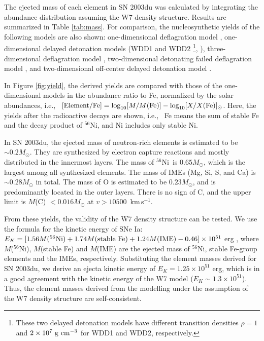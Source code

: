 \documentclass[usegraphicx,usenatbib]{mn2e}
\newcommand{\kms}{\mbox{\,km\,s$^{-1}$}}
\newcommand{\ie}{i.e.,\ }
\newcommand{\Msun}{M_{\odot}}
\newcommand{\Nifs}{$^{56}$Ni}
\begin{document}
The ejected mass of each element in SN 2003du was calculated by integrating the
abundance distribution assuming the W7 density structure. Results are summarized
in Table \ref{tab:mass}. For comparison, the nucleosynthetic yields of the
following models are also shown: one-dimensional deflagration model
\citep[W7,][]{nomoto84}, one-dimensional delayed detonation models (WDD1 and
WDD2 \footnote{These two delayed detonation models have different transition 
densities $\rho = 1$ and $2 \times 10^7 \ {\rm g\ cm^{-3}}$ for WDD1 and  WDD2,
respectively.}, \citealt{iwamoto99}), three-dimensional deflagration model
\citep[b30\_3d\_768,][]{travaglio04}, two-dimensional detonating failed
deflagration model \citep[Y12,][]{plewa07}, and two-dimensional  off-center
delayed detonation model \citep[O-DDT,][]{maeda10nuc}.

In Figure \ref{fig:yield}, the derived yields are compared with 
those of the one-dimensional models 
in the abundance ratio to Fe, normalized by the solar abundances, \ie
$[{\rm Element / Fe}] = {\rm log}_{10}[M/M({\rm Fe})] - {\rm log}_{10}[X/X({\rm Fe})]_{\odot}$.
Here, the yields after the radioactive decays are shown, \ie
Fe means the sum of stable Fe and the decay product of \Nifs,
and Ni includes only stable Ni.

In SN 2003du, the ejected mass of neutron-rich elements is estimated to be 
$\sim 0.2 \Msun$. They are synthesized by electron capture reactions and 
mostly distributed in the innermost layers. The mass of \Nifs\ is $0.65 \Msun$,
which is the largest among all synthesized elements. The mass of IMEs (Mg, Si,
S, and Ca) is $\sim 0.28 \Msun$ in total. The mass of O is estimated to be
$0.23 \Msun$, and is predominantly located in the outer layers. There is no
sign of C, and the upper limit is $M$(C) $< 0.016 \Msun$ at $v > 10500$ \kms.

From these yields, the validity of the W7 density structure can be tested. We
use the formula for the kinetic energy of SNe Ia: $E_K = [1.56 M({\rm^{56}Ni}) +
1.74 M({\rm stable\ Fe}) + 1.24 M({\rm IME}) -0.46] \times 10^{51}$ erg
\citep{woosley07}, where $M$(\Nifs), $M$(stable Fe) and $M$(IME) are the ejected
mass of \Nifs, stable Fe-group elements and the IMEs, respectively. Substituting
the element masses derived for SN 2003du, we derive an ejecta kinetic energy of
$E_K = 1.25 \times 10^{51}$ erg, which is in a good agreement with the kinetic
energy of the W7 model ($E_K \sim 1.3 \times 10^{51}$). Thus, the element masses
derived from the modelling under the assumption of the W7 density structure are
self-consistent.
\end{document}

